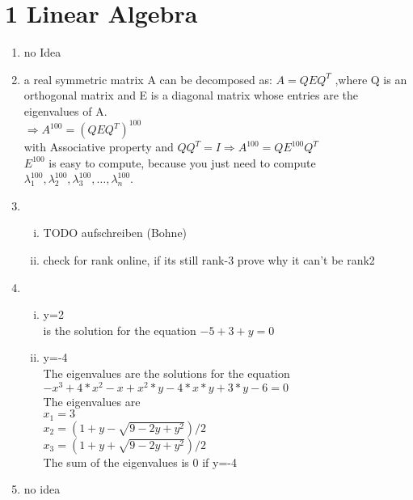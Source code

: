 \documentclass[12pt]{article}
\begin{document}

\section*{1 Linear Algebra}
\begin{enumerate}[1)]
    \item 
        no Idea
        
    \item
        a real symmetric matrix A can be decomposed as: $A=QEQ^T$ ,where Q is an orthogonal matrix and E is a diagonal matrix whose entries are the eigenvalues of A.\\
    $\Rightarrow A^{100}=(QEQ^T)^{100}$\\
    with Associative property and $QQ^T = I \Rightarrow A^{100}=QE^{100}Q^{T}$\\
    $E^{100}$ is easy to compute, because you just need to compute $\lambda_1^{100},\lambda_2^{100},\lambda_3^{100},\ldots,\lambda_n^{100}$.\\

    \item
        \begin{enumerate}[(i)]
            \item 
                TODO aufschreiben (Bohne)
            \item
                check for rank online, if its still rank-3 prove why it can't be rank2
        \end{enumerate}

    \item
        \begin{enumerate}[(i)]
            \item 
                y=2\\
                is the solution for the equation $-5+3+y=0$
            \item
                y=-4\\
                The eigenvalues are the solutions for the equation $-x^3+4*x^2-x+x^2*y-4*x*y+3*y-6=0$\\
                The eigenvalues are \\
                $x_{1} = 3$\\
                $x_{2} = (1+y-\sqrt{9-2y+y^2})/2$\\
                $x_{3} = (1+y+\sqrt{9-2y+y^2})/2$\\
                The sum of the eigenvalues is 0 if y=-4\\
        \end{enumerate}
    \item
        no idea
\end{enumerate}
\end{document}
